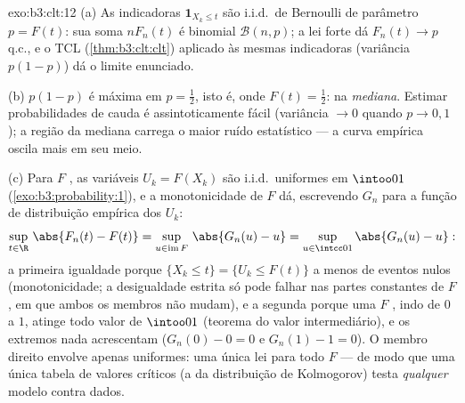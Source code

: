 \begin{solution}{exo:b3:clt:12}
(a) As indicadoras $\mathbf 1_{X_k \leq t}$ são i.i.d.\ de
Bernoulli de parâmetro $p = F(t)$: sua soma $nF_n(t)$ é
binomial $\mathcal B(n, p)$; a lei forte dá $F_n(t)
\to p$ q.c., e o TCL (\cref{thm:b3:clt:clt}) aplicado às
mesmas indicadoras (variância $p(1-p)$) dá o limite
 enunciado.

(b) $p(1 - p)$ é máxima em $p = \frac12$, isto é, onde
$F(t) = \frac12$: na \emph{mediana}. Estimar probabilidades de
cauda é assintoticamente fácil (variância $\to 0$ quando
$p \to 0, 1$); a região da mediana carrega o maior
ruído estatístico --- a curva empírica oscila mais em
seu meio.

(c) Para $F$ , as variáveis $U_k = F(X_k)$ são
i.i.d.\ uniformes em $\intoo01$ (\cref{exo:b3:probability:1}),
e a monotonicidade de $F$ dá, escrevendo $G_n$ para a
função de distribuição empírica dos $U_k$:
\[
\sup_{t\in\R}\,\abs{F_n(t) - F(t)}
= \sup_{u \in \operatorname{im}F}\,\abs{G_n(u) - u}
= \sup_{u\in\intcc01}\abs{G_n(u) - u} :
\]
a primeira igualdade porque $\{X_k \leq t\} = \{U_k \leq
F(t)\}$ a menos de eventos nulos (monotonicidade; a desigualdade estrita
só pode falhar nas partes constantes de $F$, em que ambos os membros
não mudam), e a segunda porque uma $F$ ,
indo de $0$ a $1$, atinge todo valor de
$\intoo01$ (teorema do valor intermediário), e os extremos
nada acrescentam ($G_n(0) - 0 = 0$ e $G_n(1) - 1 = 0$). O
membro direito envolve apenas uniformes: uma única lei
para todo $F$ --- de modo que uma única tabela de valores críticos (a
da distribuição de Kolmogorov) testa \emph{qualquer} modelo 
contra dados.
\end{solution}

